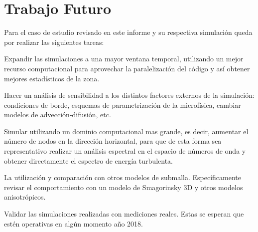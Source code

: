 \section{Trabajo Futuro}
Para el caso de estudio revisado en este informe y su respectiva simulación queda por realizar las siguientes tareas:
\begin{itemize*}
	\item Expandir las simulaciones a una mayor ventana temporal, utilizando un mejor recurso computacional para aprovechar la paralelización del código y así obtener mejores estadísticos de la zona.
	\item Hacer un análisis de sensibilidad a los distintos factores externos de la simulación: condiciones de borde, esquemas de parametrización de la microfísica, cambiar modelos de advección-difusión, etc.
	\item Simular utilizando un dominio computacional mas grande, es decir, aumentar el número de nodos en la dirección horizontal, para que de esta forma sea representativo realizar un análisis espectral en el espacio de números de onda y obtener directamente el espectro de energía turbulenta.
	\item La utilización y comparación con otros modelos de submalla. Específicamente revisar el comportamiento con un modelo de Smagorinsky 3D y otros modelos anisotrópicos.
	\item Validar las simulaciones realizadas con mediciones reales. Estas se esperan que estén operativas en algún momento año 2018.
\end{itemize*}